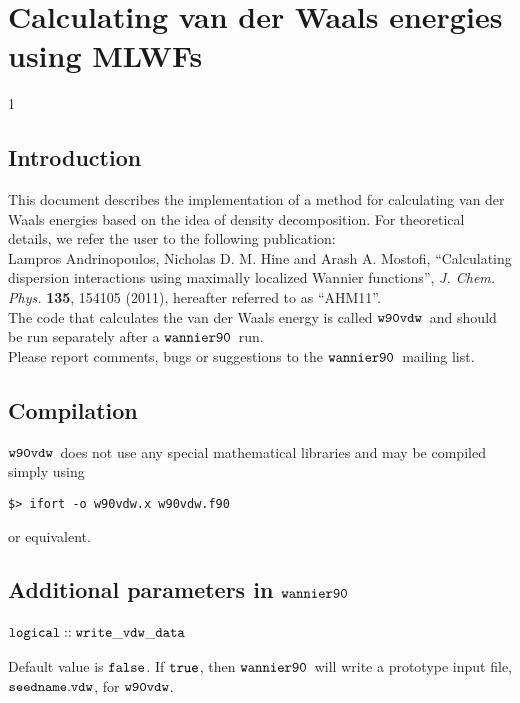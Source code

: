 \documentclass{report}
\newcommand{\wvdw}{{$\tt{w90vdw}$}}
\newcommand{\wannier}{{$\tt{wannier90}$}}
\begin{document}
\normalsize

\chapter*{Calculating van der Waals energies using MLWFs}
\addtocounter {chapter} {1}

\section{Introduction}

This document describes the implementation of a method for calculating
van der Waals energies based on the idea of density decomposition. For
theoretical details, we refer the user to the following publication:\\

Lampros Andrinopoulos, Nicholas D. M. Hine and Arash A. Mostofi,
``Calculating dispersion interactions using maximally localized Wannier functions'',
\emph{J. Chem. Phys.} \textbf{135}, 154105 (2011), hereafter referred
to as ``AHM11''. \\

The code that calculates the van der Waals energy is called
\wvdw\ and should be run separately after a \wannier\ run.\\

Please report comments, bugs or suggestions to the \wannier\ mailing
list.

\section{Compilation}

\wvdw\ does not use any special mathematical libraries and may be
compiled simply using

\begin{verbatim}
$> ifort -o w90vdw.x w90vdw.f90
\end{verbatim}

or equivalent.

\section{Additional parameters in \wannier}

\subsection{$\tt{logical :: write\_vdw\_data}$}

Default value is $\tt{false}$. If $\tt{true}$, then \wannier\ will
write a prototype input file, $\tt{seedname.vdw}$, for
\wvdw.
\end{document}
